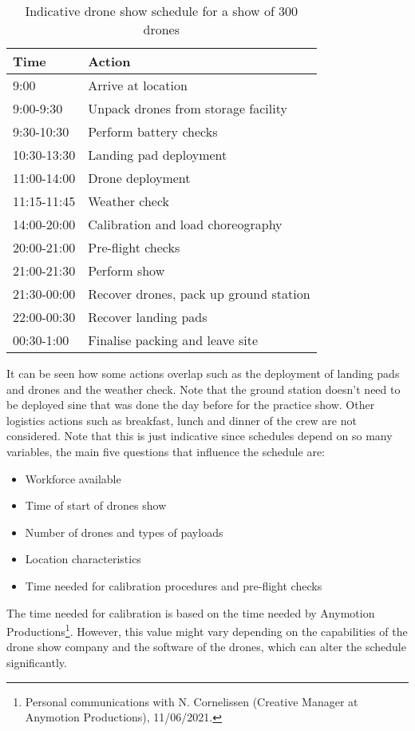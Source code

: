 \begin{table}[h]
\centering
\caption{Indicative drone show schedule for a show of 300 drones}
\label{tab:schedule}

\begin{tabular}{p{2cm}|p{8cm}}
\textbf{Time} & \textbf{Action} \\ \hline
9:00 & Arrive at location \\
9:00-9:30 & Unpack drones from storage facility \\
9:30-10:30 & Perform battery checks \\
10:30-13:30 & Landing pad deployment \\
11:00-14:00 & Drone deployment \\
11:15-11:45 & Weather check \\
14:00-20:00 & Calibration and load choreography \\
20:00-21:00 & Pre-flight checks \\
21:00-21:30 & Perform show \\
21:30-00:00 & Recover drones, pack up ground station \\
22:00-00:30 & Recover landing pads
\\
00:30-1:00 & Finalise packing and leave site
\end{tabular}%

\end{table}

It can be seen how some actions overlap such as the deployment of landing pads and drones and the weather check. Note that the ground station doesn't need to be deployed sine that was done the day before for the practice show. Other logistics actions such as breakfast, lunch and dinner of the crew are not considered. Note that this is just indicative since schedules depend on so many variables, the main five questions that influence the schedule are:

\begin{itemize} [noitemsep,nolistsep]
    \item Workforce available
    \item Time of start of drones show
    \item Number of drones and types of payloads
    \item Location characteristics
    \item Time needed for calibration procedures and pre-flight checks
\end{itemize}

The time needed for calibration is based on the time needed by Anymotion Productions\footnote{Personal communications with N. Cornelissen (Creative Manager at Anymotion Productions), 11/06/2021.}. However, this value might vary depending on the capabilities of the drone show company and the software of the drones, which can alter the schedule significantly.

